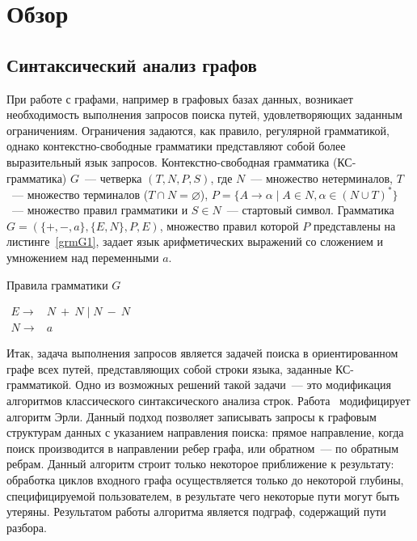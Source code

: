 \section{Обзор}
\subsection{Синтаксический анализ графов}
При работе с графами, например в графовых базах данных, возникает необходимость выполнения запросов поиска путей, удовлетворяющих заданным ограничениям. Ограничения задаются, как правило, регулярной грамматикой, однако контекстно-свободные грамматики представляют собой более выразительный язык запросов. Контекстно-свободная грамматика (КС-грамматика) $G$~--- четверка $(T, N, P, S)$, где $N$~--- множество нетерминалов, $T$~--- множество терминалов ($T \cap N = \varnothing$), $P = \{ A \rightarrow \alpha \mid A \in N, \alpha \in (N \cup T)^*\}$~--- множество правил грамматики и $S \in N$~--- стартовый символ. Грамматика $G = (\{+, -, a\}, \{ E, N \}, P, E)$, множество правил которой $P$ представлены на листинге~\ref{grmG1}, задает язык арифметических выражений со сложением и умножением над переменными $a$.

\begin{listing}
\caption{Правила грамматики $G$}
\label{grmG1}
\centering
$\begin{array}{ll}
E \rightarrow & N \ + \ N \mid N \ - \ N
\\
N \rightarrow & a
\end{array}$
 \end{listing}

Итак, задача выполнения запросов является задачей поиска в ориентированном графе всех путей, представляющих собой строки языка, заданные КС-грамматикой. Одно из возможных решений такой задачи~--- это модификация алгоритмов классического синтаксического анализа строк. Работа~\cite{Sevon} модифицирует алгоритм Эрли. Данный подход позволяет записывать запросы к графовым структурам данных с указанием направления поиска: прямое направление, когда поиск производится в направлении ребер графа, или обратном~--- по обратным ребрам. Данный алгоритм строит только некоторое приближение к результату: обработка циклов входного графа осуществляется только до некоторой глубины, специфицируемой пользователем, в результате чего некоторые пути могут быть утеряны. Результатом работы алгоритма является подграф, содержащий пути разбора. 


